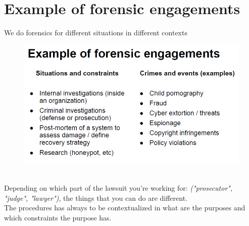 \section{Example of forensic engagements}
    We do forensics for different situations in different contexts
    \begin{figure}[ht!]
        \centering
        \includegraphics[width=0.5\linewidth]{lecture_3/forensics.png}
    \end{figure}
    \\Depending on which part of the lawsuit you're working for: \textit{("prosecutor", "judge", "lawyer")}, the things that you can do are different.\\
    The procedures has always to be contextualized in what are the purposes and which constraints the purpose has.          